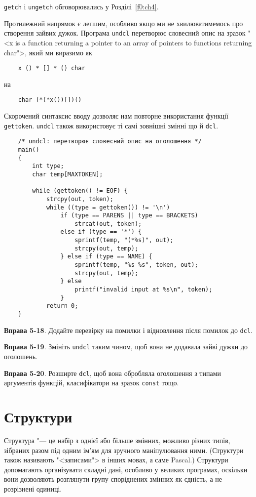 \documentclass[a4paper,12pt]{book}
\begin{document}
  \texttt{getch} і \texttt{ungetch} обговорювались у Розділі~\ref{f0:ch4}.

  Протилежний напрямок є легшим, особливо якщо ми не хвилюватимемось про створення зайвих
  дужок. Програма \texttt{undcl} перетворює словесний опис на зразок "<x is a
  function returning a pointer to an array of pointers to functions returning char">,
  який ми виразимо як
  \begin{verbatim}
    x () * [] * () char
  \end{verbatim}
  на
  \begin{verbatim}
    char (*(*x())[])()
  \end{verbatim}

  Скорочений синтаксис вводу дозволяє нам повторне використання функції \texttt{gettoken}.
  \texttt{undcl} також використовує ті самі зовнішні змінні що й \texttt{dcl}.
  \begin{verbatim}
    /* undcl: перетворює словесний опис на оголошення */
    main()
    {
        int type;
        char temp[MAXTOKEN];

        while (gettoken() != EOF) {
            strcpy(out, token);
            while ((type = gettoken()) != '\n')
                if (type == PARENS || type == BRACKETS)
                    strcat(out, token);
                else if (type == '*') {
                    sprintf(temp, "(*%s)", out);
                    strcpy(out, temp);
                } else if (type == NAME) {
                    sprintf(temp, "%s %s", token, out);
                    strcpy(out, temp);
                } else
                    printf("invalid input at %s\n", token);
                }
            return 0;
    }
  \end{verbatim}

  \textbf{Вправа 5-18}. Додайте перевірку на помилки і відновлення після помилок до
  \texttt{dcl}.

  \textbf{Вправа 5-19}. Змініть \texttt{undcl} таким чином, щоб вона не додавала зайві дужки
  до оголошень.

  \textbf{Вправа 5-20}. Розширте \texttt{dcl}, щоб вона обробляла оголошення з типами
  аргументів функцій, класифікатори на зразок \texttt{const} тощо.

\chapter{Структури}

\label{f0:ch6}
  Структура "--- це набір з однієї або більше змінних, можливо різних типів, зібраних
  разом під одним ім'ям для зручного маніпулювання ними. (Структури також називають
  "<записами"> в інших мовах, а саме Pascal.) Структури допомагають організувати
  складні дані, особливо у великих програмах, оскільки вони дозволяють розглянути групу
  споріднених змінних як єдність, а не розрізнені одиниці.
\end{document}
